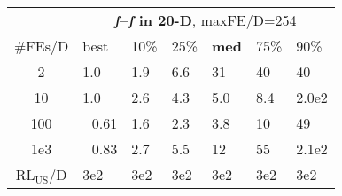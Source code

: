 \begin{tabular}{c|llllll}
 & \multicolumn{6}{|c}{\textbf{\textit{f}\raisebox{-0.35ex}{1}--\textit{f}\raisebox{-0.35ex}{24} in 20-D}, maxFE/D=254}\\
\#FEs/D & best & 10\% & 25\% & \textbf{med} & 75\% & 90\%\\
2 & \hspace*{1ex}1.0 & \hspace*{1ex}1.9 & \hspace*{1ex}6.6 & 31 & 40 & 40\\
10 & \hspace*{1ex}1.0 & \hspace*{1ex}2.6 & \hspace*{1ex}4.3 & \hspace*{1ex}5.0 & \hspace*{1ex}8.4 & 2.0e2\\
100 & ~\,0.61 & \hspace*{1ex}1.6 & \hspace*{1ex}2.3 & \hspace*{1ex}3.8 & 10 & 49\\
1e3 & ~\,0.83 & \hspace*{1ex}2.7 & \hspace*{1ex}5.5 & 12 & 55 & 2.1e2\\
$\text{RL}_{\text{US}}$/D & 3e2 & 3e2 & 3e2 & 3e2 & 3e2 & 3e2
\end{tabular}
